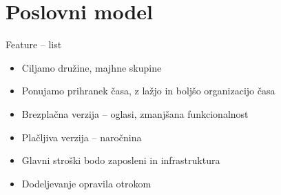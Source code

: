 \documentclass[10pt]{beamer}
\begin{document}
\section{Poslovni model}

\begin{frame}{Feature -- list}
    \begin{itemize}
        \item Ciljamo družine, majhne skupine
        \item Ponujamo prihranek časa, z lažjo in boljšo organizacijo časa
        \item Brezplačna verzija -- oglasi, zmanjšana funkcionalnost
        \item Plačljiva verzija -- naročnina
        \item Glavni stroški bodo zaposleni in infrastruktura
        \item Dodeljevanje opravila otrokom
    \end{itemize}
\end{frame}
\end{document}
